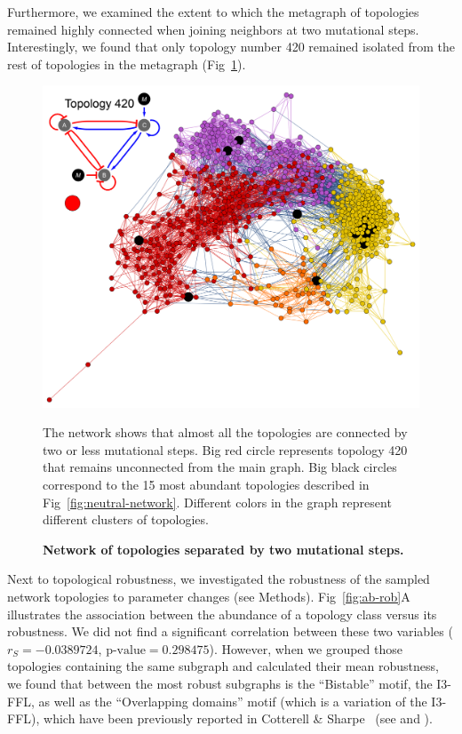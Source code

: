 \documentclass[10pt,letterpaper]{article}
\begin{document}
Furthermore, we examined the extent to which the metagraph of topologies
remained highly connected when joining neighbors at two mutational steps.
Interestingly, we found that only topology number 420 remained isolated from
the rest of topologies in the metagraph (Fig~\ref{fig:2neut-net}).

\begin{figure}
 \includegraphics[width=\textwidth]{figures/results/Fig5}
 \caption{\bf Network of topologies separated by two mutational steps.}
 The network shows that almost all the topologies are connected by two or less
 mutational steps. Big red circle represents topology 420 that remains
 unconnected from the main graph. Big black circles correspond to the 15
 most abundant topologies described in Fig~\ref{fig:neutral-network}.
 Different colors in the graph represent different clusters of topologies.
 \label{fig:2neut-net}
\end{figure}

Next to topological robustness, we investigated the robustness of the sampled
network topologies to parameter changes (see Methods). Fig~\ref{fig:ab-rob}A
illustrates the association between the abundance of a topology class versus its
robustness. We did not find a significant correlation between
these two variables ($r_S = −0.0389724$, $\text{p-value} = 0.298475$).
However, when we grouped those topologies containing
the same subgraph and calculated their mean robustness, we found that between
the most robust subgraphs is the ``Bistable'' motif, the I3-FFL, as well as
the ``Overlapping domains'' motif (which is a variation of the I3-FFL), which
have been previously reported in Cotterell \& Sharpe~\cite{Cotterell2010}
(see  and ).
\end{document}
